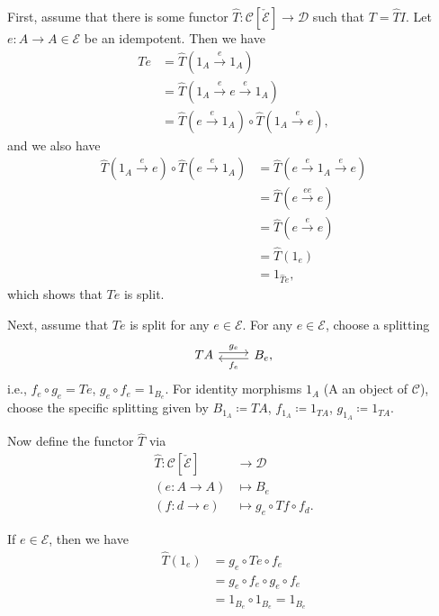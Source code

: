 First, assume that there is some functor $\widehat{T}\colon \mathcal{C}[\check{\mathcal{E}}]\to \mathcal{D}$
such that $T = \widehat{T}I$. Let $e : A\to A \in \mathcal{E}$ be an idempotent. Then we have
\begin{align*}
	Te &= \widehat{T}(1_A \stackrel{e}{\longrightarrow}1_A)\\
	&= \widehat{T}(1_A \stackrel{e}{\longrightarrow}e\stackrel{e}{\longrightarrow}1_A)\\
	&= \widehat{T}(e\stackrel{e}{\longrightarrow}1_A)\circ \widehat{T}(1_A\stackrel{e}{\longrightarrow}e),
\end{align*}
and we also have
\begin{align*}
	\widehat{T}(1_A\stackrel{e}{\longrightarrow} e)\circ\widehat{T}(e\stackrel{e}{\longrightarrow}1_A)
	&= \widehat{T}(e\stackrel{e}{\longrightarrow}1_A\stackrel{e}{\longrightarrow}e)\\
	&= \widehat{T}(e\stackrel{ee}{\longrightarrow}e)\\
	&= \widehat{T}(e\stackrel{e}{\longrightarrow}e)\\
	&= \widehat{T}(1_e)\\
	&= 1_{\widehat{T}e},
\end{align*}
which shows that $Te$ is split.

Next, assume that $Te$ is split for any $e \in \mathcal{E}$. For any $e \in \mathcal{E}$,
choose a splitting
\[\begin{tikzcd}
	TA \ar[r, "g_e", shift left] & B_e\ar[l, "f_e", shift left],
\end{tikzcd}\]
i.e., $f_e \circ g_e = Te$, $g_e \circ f_e = 1_{B_e}$.
For identity morphisms $1_A$ (A an object of $\mathcal{C}$), choose the specific splitting
given by $B_{1_A} \coloneqq TA$, $f_{1_A} \coloneqq 1_{TA}$, $g_{1_A}\coloneqq 1_{TA}$.

Now define the functor $\widehat{T}$ via
\begin{align*}
	\widehat{T}\colon \mathcal{C}[\check{\mathcal{E}}] &\to \mathcal{D}\\
	(e\colon A\to A) &\mapsto B_e\\
	(f\colon d\to e) &\mapsto g_e \circ Tf \circ f_d.
\end{align*}

If $e \in \mathcal{E}$, then we have
\begin{align*}
	\widehat{T}(1_e) &= g_e \circ Te \circ f_e\\
	&= g_e \circ f_e \circ g_e \circ f_e\\
	&= 1_{B_e} \circ 1_{B_e} = 1_{B_e}
\end{align*}

